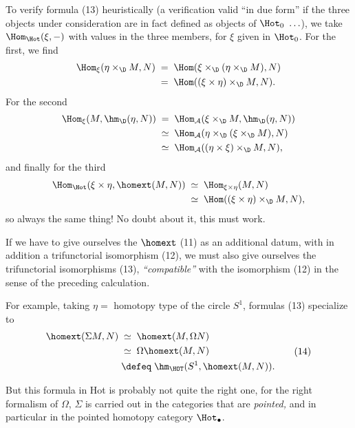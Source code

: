 To verify formula (13) heuristically (a verification valid ``in due form'' if the three objects under consideration are in fact defined as objects of $\Hot_0\ \ldots$), we take $\Hom_{\Hot}(\xi,-)$ with values in the three members, for $\xi$ given in $\Hot_0$. For the first, we find
\[
\begin{aligned}
\Hom_{\xi}(\eta\times_{\D}M,N) &\;=\;\Hom(\xi\times_{\D}(\eta\times_{\D}M),N)\\
&\;=\;\Hom((\xi\times\eta)\times_{\D}M,N).
\end{aligned}
\]
For the second
\[
\begin{aligned}
\Hom_{\xi}(M,\hm_{\D}(\eta,N)) &\;=\;\Hom_{\mathcal{A}}(\xi\times_{\D}M,\hm_{\D}(\eta,N))\\
&\;\simeq\;\Hom_{\mathcal{A}}(\eta\times_{\D}(\xi\times_{\D}M),N)\\
&\;\simeq\;\Hom_{\mathcal{A}}((\eta\times\xi)\times_{\D}M,N),
\end{aligned}
\]
and finally for the third
\[
\begin{aligned}
\Hom_{\Hot}(\xi\times\eta,\homext(M,N)) &\;\simeq\;\Hom_{\xi\times\eta}(M,N)\\
&\;\simeq\;\Hom((\xi\times\eta)\times_{\D}M,N),
\end{aligned}
\]
so always the same thing! No doubt about it, this must work.

If we have to give ourselves the $\homext$ (11) as an additional datum, with in addition a trifunctorial isomorphism (12), we must also give ourselves the trifunctorial isomorphisms (13), \textit{``compatible''} with the isomorphism (12) in the sense of the preceding calculation.


For example, taking $\eta=$ homotopy type of the circle $S^1$, formulas (13) specialize to
\[
\begin{aligned}
\homext(\Sigma M,N) &\;\simeq\;\homext(M,\Omega N)\\
&\;\simeq\;\Omega\homext(M,N)\\
&\;\defeq\;\hm_{\HOT}(S^1,\homext(M,N)).
\end{aligned}
\tag*{(14)}
\]

But this formula in Hot is probably not quite the right one, for the right formalism of $\Omega$, $\Sigma$ is carried out in the categories that are \textit{pointed,} and in particular in the pointed homotopy category $\Hot_{\bullet}$. %

